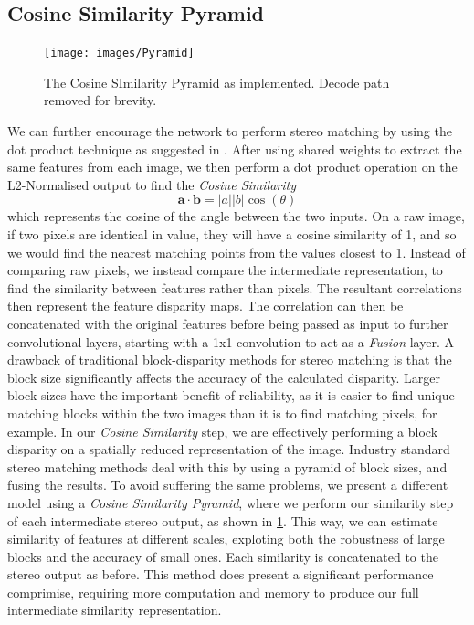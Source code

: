 \documentclass[ %
                    author={Gavin Parker},
                supervisor={Dr. Neill Campbell},
                    degree={MEng},
                     title={Deep Siamese Networks for Illumination Estimation from Stereo Images},
                  subtitle={},
                      type={research},
                      year={2018} ]{dissertation}
\begin{document}
\subsection{Cosine Similarity Pyramid}
\begin{figure}[H]
\label{pyramid}
\centering
\texttt{[image: images/Pyramid]}
\caption{The Cosine SImilarity Pyramid as implemented. Decode path removed for brevity.}
\end{figure}
We can further encourage the network to perform stereo matching by using the dot product technique as suggested in \cite{7780983}. After using shared weights to extract the same features from each image, we then perform a dot product operation on the L2-Normalised output to find the \textit{Cosine Similarity}
\[\bm{a}\cdot \bm{b} = \lvert a \rvert \lvert b\rvert \cos(\theta) \]
which represents the cosine of the angle between the two inputs. On a raw image, if two pixels are identical in value, they will have a cosine similarity of 1, and so we would find the nearest matching points from the values closest to 1. Instead of comparing raw pixels, we instead compare the intermediate representation, to find the similarity between features rather than pixels. The resultant correlations then represent the feature disparity maps. The correlation can then be concatenated with the original features before being passed as input to further convolutional layers, starting with a 1x1 convolution to act as a \textit{Fusion} layer.
\newline
A drawback of traditional block-disparity methods for stereo matching is that the block size significantly affects the accuracy of the calculated disparity. Larger block sizes have the important benefit of reliability, as it is easier to find unique matching blocks within the two images than it is to find matching pixels, for example. In our \textit{Cosine Similarity} step, we are effectively performing a block disparity on a spatially reduced representation of the image. Industry standard stereo matching methods deal with this by using a pyramid of block sizes, and fusing the results. To avoid suffering the same problems, we present a different model using a \textit{Cosine Similarity Pyramid}, where we perform our similarity step of each intermediate stereo output, as shown in \ref{pyramid}. This way, we can estimate similarity of features at different scales, exploting both the robustness of large blocks and the accuracy of small ones. Each similarity is concatenated to the stereo output as before. This method does present a significant performance comprimise, requiring more computation and memory to produce our full intermediate similarity representation.
\end{document}
